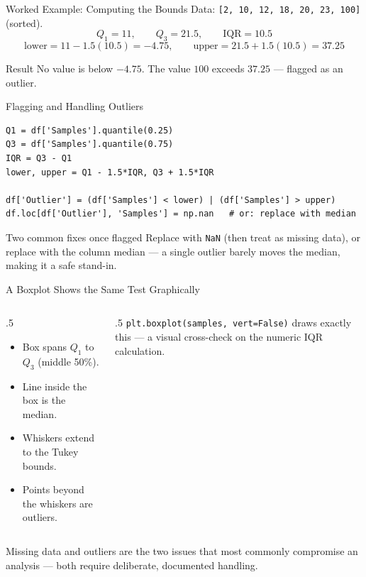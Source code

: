 \documentclass[9pt,aspectratio=169,xcolor=table]{beamer}
\begin{document}
\begin{frame}{Worked Example: Computing the Bounds}
    \leavevmode
    Data: \texttt{[2, 10, 12, 18, 20, 23, 100]} (sorted).
    \[
    Q_1 = 11, \qquad Q_3 = 21.5, \qquad \text{IQR} = 10.5
    \]
    \[
    \text{lower} = 11 - 1.5(10.5) = -4.75, \qquad
    \text{upper} = 21.5 + 1.5(10.5) = 37.25
    \]

    \vspace{3mm}
    \begin{block}{Result}
        No value is below $-4.75$. The value $100$ exceeds $37.25$ ---
        flagged as an outlier.
    \end{block}
\end{frame}

\begin{frame}[fragile]{Flagging and Handling Outliers}
    \leavevmode
\begin{lstlisting}
Q1 = df['Samples'].quantile(0.25)
Q3 = df['Samples'].quantile(0.75)
IQR = Q3 - Q1
lower, upper = Q1 - 1.5*IQR, Q3 + 1.5*IQR

df['Outlier'] = (df['Samples'] < lower) | (df['Samples'] > upper)
df.loc[df['Outlier'], 'Samples'] = np.nan   # or: replace with median
\end{lstlisting}

    \begin{block}{Two common fixes once flagged}
        \small Replace with \texttt{NaN} (then treat as missing data), or
        replace with the column \alert{median} --- a single outlier
        barely moves the median, making it a safe stand-in.
    \end{block}
\end{frame}

\begin{frame}{A Boxplot Shows the Same Test Graphically}
    \leavevmode
    \begin{columns}[t]
        \begin{column}{.5\textwidth}
            \begin{itemize}
                \item Box spans $Q_1$ to $Q_3$ (middle 50\%).
                \item Line inside the box is the median.
                \item Whiskers extend to the Tukey bounds.
                \item Points beyond the whiskers are outliers.
            \end{itemize}
        \end{column}
        \begin{column}{.5\textwidth}
            \small
            \texttt{plt.boxplot(samples, vert=False)} draws exactly this
            --- a visual cross-check on the numeric IQR calculation.
        \end{column}
    \end{columns}

    \vspace{3mm}
    {\small Missing data and outliers are the two issues that most
    commonly compromise an analysis --- both require deliberate,
    documented handling.}
\end{frame}
\end{document}
